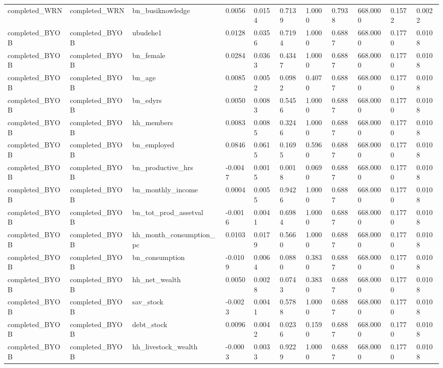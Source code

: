 \begin{tabular}{lllllllllll}
completed\_WRN & completed\_WRN & bn\_busiknowledge & 0.0056 & 0.0154 & 0.7139 & 1.0000 & 0.7938 & 668.0000 & 0.1572 & 0.0022 \\
completed\_BYOB & completed\_BYOB & ubudehe1 & 0.0128 & 0.0356 & 0.7194 & 1.0000 & 0.6887 & 668.0000 & 0.1770 & 0.0108 \\
completed\_BYOB & completed\_BYOB & bn\_female & 0.0284 & 0.0363 & 0.4347 & 1.0000 & 0.6887 & 668.0000 & 0.1770 & 0.0108 \\
completed\_BYOB & completed\_BYOB & bn\_age & 0.0085 & 0.0052 & 0.0982 & 0.4070 & 0.6887 & 668.0000 & 0.1770 & 0.0108 \\
completed\_BYOB & completed\_BYOB & bn\_edyrs & 0.0050 & 0.0083 & 0.5456 & 1.0000 & 0.6887 & 668.0000 & 0.1770 & 0.0108 \\
completed\_BYOB & completed\_BYOB & hh\_members & 0.0083 & 0.0085 & 0.3246 & 1.0000 & 0.6887 & 668.0000 & 0.1770 & 0.0108 \\
completed\_BYOB & completed\_BYOB & bn\_employed & 0.0846 & 0.0615 & 0.1695 & 0.5960 & 0.6887 & 668.0000 & 0.1770 & 0.0108 \\
completed\_BYOB & completed\_BYOB & bn\_productive\_hrs & -0.0047 & 0.0015 & 0.0018 & 0.0690 & 0.6887 & 668.0000 & 0.1770 & 0.0108 \\
completed\_BYOB & completed\_BYOB & bn\_monthly\_income & 0.0004 & 0.0055 & 0.9426 & 1.0000 & 0.6887 & 668.0000 & 0.1770 & 0.0108 \\
completed\_BYOB & completed\_BYOB & bn\_tot\_prod\_assetval & -0.0016 & 0.0041 & 0.6984 & 1.0000 & 0.6887 & 668.0000 & 0.1770 & 0.0108 \\
completed\_BYOB & completed\_BYOB & hh\_month\_consumption\_pc & 0.0103 & 0.0179 & 0.5660 & 1.0000 & 0.6887 & 668.0000 & 0.1770 & 0.0108 \\
completed\_BYOB & completed\_BYOB & bn\_consumption & -0.0109 & 0.0064 & 0.0880 & 0.3830 & 0.6887 & 668.0000 & 0.1770 & 0.0108 \\
completed\_BYOB & completed\_BYOB & hh\_net\_wealth & 0.0050 & 0.0028 & 0.0743 & 0.3830 & 0.6887 & 668.0000 & 0.1770 & 0.0108 \\
completed\_BYOB & completed\_BYOB & sav\_stock & -0.0023 & 0.0041 & 0.5788 & 1.0000 & 0.6887 & 668.0000 & 0.1770 & 0.0108 \\
completed\_BYOB & completed\_BYOB & debt\_stock & 0.0096 & 0.0042 & 0.0236 & 0.1590 & 0.6887 & 668.0000 & 0.1770 & 0.0108 \\
completed\_BYOB & completed\_BYOB & hh\_livestock\_wealth & -0.0003 & 0.0033 & 0.9229 & 1.0000 & 0.6887 & 668.0000 & 0.1770 & 0.0108 \\

\end{tabular}
